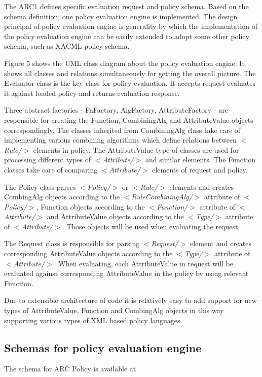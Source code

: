 \documentclass{book}
\begin{document}
The ARC1 defines specific evaluation request and policy schema. Based on the schema definition, one policy evaluation engine is implemented. The design principal of policy evaluation engine is generality by which the implementation of the policy evaluation engine can be easily extended to adopt some other policy schema, such as XACML policy schema.

Figure 5 shows the UML class diagram about the policy evaluation engine. It shows all classes and relations simultaneously for getting the overall picture. 
The Evaluator class is the key class for policy evaluation. It accepts request evaluates it against loaded policy and returns evaluation response. 

Three abstract factories - FnFactory, AlgFactory, AttributeFactory - are responsible for creating the Function, CombiningAlg and AttributeValue objects correspondingly. The classes inherited from CombiningAlg class take care of implementing various combining algorithms which define relations between \textit{$<$Rule/$>$} elements in policy. The AttributeValue type of classes are used for processing different types of \textit{$<$Attribute/$>$} and similar elements. The Function classes take care of comparing \textit{$<$Attribute/$>$} elements of request and policy. 

The Policy class parses \textit{$<$Policy/$>$} or \textit{$<$Rule/$>$} elements and creates  CombingAlg objects according to the \textit{$<$RuleCombiningAlg/$>$} attribute of \textit{$<$Policy/$>$}, Function objects according to the \textit{$<$Function/$>$} attribute of \textit{$<$Attribute/$>$} and AttributeValue objects according to the \textit{$<$Type/$>$} attribute of \textit{$<$Attribute/$>$}. Those objects will be used when evaluating the request.

The Request class is responsible for parsing \textit{$<$Request/$>$} element and creates corresponding AttributeValue objects according to the \textit{$<$Type/$>$} attribute of \textit{$<$Attribute/$>$}. When evaluating, each AttributeValue in request will be evaluated against corresponding AttributeValue in the policy by using relevant Function.

Due to extensible architecture of code it is relatively easy to add support for new types of  AttributeValue, Function and CombingAlg objects in this way supporting various types of XML based policy languages.


\subsection{Schemas for policy evaluation engine} %
\label{subsec:policy_schema}
The schema for ARC Policy is available at
\end{document}
